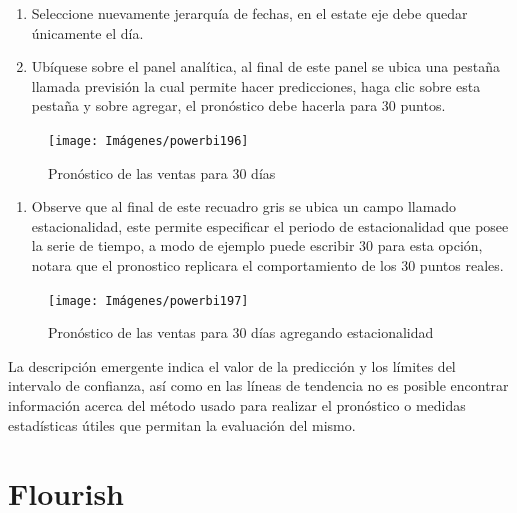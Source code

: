 \documentclass[
]{book}
\providecommand{\tightlist}{%
  \setlength{\itemsep}{0pt}\setlength{\parskip}{0pt}}
\begin{document}
\begin{enumerate}
\def\labelenumi{\arabic{enumi}.}
\setcounter{enumi}{4}
\item
  Seleccione nuevamente jerarquía de fechas, en el estate eje debe quedar únicamente el día.
\item
  Ubíquese sobre el panel analítica, al final de este panel se ubica una pestaña llamada previsión la cual permite hacer predicciones, haga clic sobre esta pestaña y sobre agregar, el pronóstico debe hacerla para 30 puntos.
\end{enumerate}

\begin{figure}

{\centering \texttt{[image: Imágenes/powerbi196]} 

}

\caption{Pronóstico de las ventas para 30 días}\label{fig:paso6pronosticopowerbi-fig}
\end{figure}

\begin{enumerate}
\def\labelenumi{\arabic{enumi}.}
\setcounter{enumi}{6}
\tightlist
\item
  Observe que al final de este recuadro gris se ubica un campo llamado estacionalidad, este permite especificar el periodo de estacionalidad que posee la serie de tiempo, a modo de ejemplo puede escribir 30 para esta opción, notara que el pronostico replicara el comportamiento de los 30 puntos reales.
\end{enumerate}

\begin{figure}

{\centering \texttt{[image: Imágenes/powerbi197]} 

}

\caption{Pronóstico de las ventas para 30 días agregando estacionalidad}\label{fig:paso7pronosticopowerbi-fig}
\end{figure}

La descripción emergente indica el valor de la predicción y los límites del intervalo de confianza, así como en las líneas de tendencia no es posible encontrar información acerca del método usado para realizar el pronóstico o medidas estadísticas útiles que permitan la evaluación del mismo.

\hypertarget{flourish}{%
\chapter{Flourish}\label{flourish}}
\end{document}
